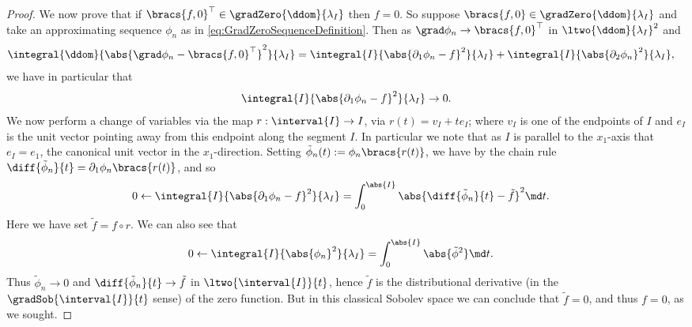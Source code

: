 \begin{proof}
	We now prove that if $\bracs{f,0}^\top\in\gradZero{\ddom}{\lambda_I}$ then $f=0$.
	So suppose $\bracs{f,0}\in\gradZero{\ddom}{\lambda_I}$ and take an approximating sequence $\phi_n$ as in \eqref{eq:GradZeroSequenceDefinition}.
	Then as $\grad\phi_n\rightarrow\bracs{f,0}^\top$ in $\ltwo{\ddom}{\lambda_I}^2$ and
	\begin{align*}
		\integral{\ddom}{\abs{\grad\phi_n - \bracs{f,0}^\top}^2}{\lambda_I}
		&= \integral{I}{\abs{\partial_1\phi_n - f}^2}{\lambda_I} + \integral{I}{\abs{\partial_2\phi_n}^2}{\lambda_I},
	\end{align*}
	we have in particular that
	\begin{align*}
		\integral{I}{\abs{\partial_1\phi_n - f}^2}{\lambda_I} \rightarrow 0.
	\end{align*}
	We now perform a change of variables via the map $r:\interval{I}\rightarrow I$, via $r(t) = v_I + te_I$; where $v_I$ is one of the endpoints of $I$ and $e_I$ is the unit vector pointing away from this endpoint along the segment $I$.
	In particular we note that as $I$ is parallel to the $x_1$-axis that $e_I=e_1$, the canonical unit vector in the $x_1$-direction.
	Setting $\tilde{\phi}_n(t) := \phi_n\bracs{r(t)}$, we have by the chain rule $\diff{\tilde{\phi}_n}{t} = \partial_1\phi_n\bracs{r(t)}$, and so
	\begin{align*}
		0 &\leftarrow \integral{I}{\abs{\partial_1\phi_n - f}^2}{\lambda_I} 
		= \int_0^{\abs{I}}\abs{\diff{\tilde{\phi}_n}{t} - \tilde{f}}^2 \md t.
	\end{align*}
	Here we have set $\tilde{f} = f \circ r$.
	We can also see that
	\begin{align*}
		0 &\leftarrow \integral{I}{\abs{\phi_n}^2}{\lambda_I} 
		= \int_0^{\abs{I}} \abs{\tilde{\phi}^2} \md t.
	\end{align*}
	Thus $\tilde{\phi}_n\rightarrow 0$ and $\diff{\tilde{\phi}_n}{t}\rightarrow \tilde{f}$ in $\ltwo{\interval{I}}{t}$, hence $\tilde{f}$ is the distributional derivative (in the $\gradSob{\interval{I}}{t}$ sense) of the zero function.
	But in this classical Sobolev space we can conclude that $\tilde{f} = 0$, and thus $f = 0$, as we sought.
\end{proof}

